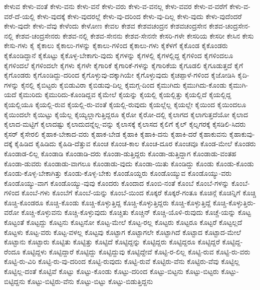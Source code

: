 {ಕೇಳುವ
ಕೇಳು-ವಂತೆ
ಕೇಳು-ವನು
ಕೇಳು-ವನೆ
ಕೇಳು-ವರು
ಕೇಳು-ವ-ವನಲ್ಲ
ಕೇಳು-ವವರ
ಕೇಳು-ವ-ವರೆಗೆ
ಕೇಳು-ವ-ವರೆ-ದೆ-ಯಲ್ಲಿ
ಕೇಳು-ವುದಕ್ಕೆ
ಕೇಳು-ವುದರಲ್ಲೆ
ಕೇಳು-ವು-ದರಿಂದ
ಕೇಳು-ವು-ದಿಲ್ಲ
ಕೇಳು-ವುದು
ಕೇಳು-ವುದೆಂದರೆ
ಕೇಳು-ವುದೇ
ಕೇಳು-ವೆವು
ಕೇಳೆಂದು
ಕೇಳೋಣ
ಕೇವಲ
ಕೇಶವ
ಕೇಶವಚಂದ್ರನ
ಕೇಶವಚಂದ್ರಸೇನ
ಕೇಶವ-ಚಂದ್ರಸೇನ-ನಲ್ಲಿ
ಕೇಶವ-ಚಂದ್ರಸೇನರು
ಕೇಶವ-ನಲ್ಲಿ
ಕೇಶವ-ಸೇನನು
ಕೇಶವ-ಸೇನನೇ
ಕೇಸರಿ-ಗಳೇ
ಕೇಸರಿಯ
ಕೇಸರೀ
ಕೇಸಿನ
ಕೇಸು
ಕೇಸು-ಗಳು
ಕೈ
ಕೈಕಾಲು
ಕೈಕಾಲು-ಗಳನ್ನು
ಕೈಕಾಲು-ಗಳಿಂದ
ಕೈಕಾಲು-ಗಳು
ಕೈಕೆಳಗೆ
ಕೈಕೊಂಡ
ಕೈಕೊಂಡರು
ಕೈಕೊಂಡಿದ್ದಾನೆ
ಕೈಕೊಟ್ಟು
ಕೈಕೊಳ್ಳ-ಬೇಕಾಗು-ವುದು
ಕೈಗಳನ್ನು
ಕೈಗಳಲ್ಲಿ
ಕೈಗಳಲ್ಲಿದ್ದ
ಕೈಗಳಿಂದ
ಕೈಗಳಿಂದಲೂ
ಕೈಗಳಿಂದಲೆ
ಕೈಗಳಿಂದಲೇ
ಕೈಗಳು
ಕೈಗಳೇ
ಕೈಗಾರಿಕೆ
ಕೈಗಾರಿಕೆ-ಗಳನ್ನು
ಕೈಗಾರಿಕೆಯ
ಕೈಗೂಡಲಿ
ಕೈಗೂಡುತ್ತದೆ
ಕೈಗೆ
ಕೈಗೊಂಡರು
ಕೈಗೊಂಡಿದ್ದು-ದರಿಂದ
ಕೈಗೊಳ್ಳುವು-ದಕ್ಕಾಗಿಯೇ
ಕೈಗೊಳ್ಳುವುದು
ಕೈಚಪ್ಪಾಳೆ-ಗಳಿಂದ
ಕೈಜೋಡಿಸಿ
ಕೈದಿ-ಗಳನ್ನು
ಕೈನಲ್ಲಿ
ಕೈಬಿಟ್ಟರು
ಕೈಬಿಡುವಿರಾ
ಕೈಬಿಡುವು-ದಿಲ್ಲ
ಕೈಮಗ್ಗ-ದಿಂದ
ಕೈಮುಗಿದು
ಕೈಮುಗಿದು-ಕೊಂಡು
ಕೈಮುಗಿ-ಯದೆ
ಕೈಮುರಿದು
ಕೈಮುರಿದು-ಕೊಂಡಿದ್ದವ
ಕೈಮೇಲೆ
ಕೈಯನ್ನು
ಕೈಯಲ್ಲಿ
ಕೈಯಲ್ಲಿತ್ತು
ಕೈಯಲ್ಲಿದೆ
ಕೈಯಲ್ಲಿದ್ದ
ಕೈಯಲ್ಲಿಯೂ
ಕೈಯಲ್ಲಿ-ರುವ
ಕೈಯಲ್ಲಿ-ರು-ವಂತೆ
ಕೈಯಲ್ಲಿ-ರುವುದು
ಕೈಯಲ್ಲೆಲ್ಲ
ಕೈಯಲ್ಲೇ
ಕೈಯಿಂದ
ಕೈಯಿಂದಲೂ
ಕೈಯಿಂದಲೇ
ಕೈಯಿಟ್ಟು
ಕೈಯೆಲ್ಲ
ಕೈಯ್ಯಲ್ಲಾಗುತ್ತಿದ್ದರೂ
ಕೈರೋ
ಕೈರೋ-ದಲ್ಲಿ
ಕೈಲಾಗದ
ಕೈಲಾಗುತ್ತದೆಯೋ
ಕೈಲಾದ
ಕೈಲಾದ-ಮಟ್ಟಿಗೆ
ಕೈಲಾದಷ್ಟು
ಕೈಲಾದುದನ್ನೆಲ್ಲ-ವನ್ನು
ಕೈಲಾಸಕ್ಕೆ
ಕೈಲಾಸದ
ಕೈಲಿಗೆ
ಕೈಲ್
ಕೈಲ್ನಗರಕ್ಕೆ
ಕೈಸಡಿಲಿ-ಸಿದರು
ಕೈಸರ್
ಕೈಸೇರಲಿ
ಕೈಹಾಕ-ಬೇಕಾದ-ವರು
ಕೈಹಾಕ-ಬೇಡ
ಕೈಹಾಕಿ
ಕೈಹಾಕಿ-ದನು
ಕೈಹಾಕಿ-ದರೆ
ಕೈಹಾಕುವನು
ಕೈಹಾಕುವು-ದಕ್ಕೆ
ಕೈಹಿಡಿದ
ಕೈಹಿಡಿದು
ಕೈಹಿಡಿ-ದೆತ್ತುವ
ಕೊಂಚ
ಕೊಂಚ-ಕಾಲ
ಕೊಂಚ-ದೂರ
ಕೊಂಚವೂ
ಕೊಂಡ-ಮೇಲೆ
ಕೊಂಡರು
ಕೊಂಡಾಡ-ಲಿಲ್ಲ
ಕೊಂಡಾಡಿ
ಕೊಂಡಾಡಿ-ದರು
ಕೊಂಡಾ-ಡುತ್ತಿದ್ದರು
ಕೊಂಡಾ-ಡುತ್ತಿದ್ದಾಗ
ಕೊಂಡಾಡು-ವಂತಹ
ಕೊಂಡಾ-ಡುವರು
ಕೊಂಡಾಡು-ವಾಗಲೂ
ಕೊಂಡಾಡು-ವುದು
ಕೊಂಡಾ-ಯಿತು
ಕೊಂಡಿದ್ದು
ಕೊಂಡು
ಕೊಂಡು-ಕೊಂಡು
ಕೊಂಡು-ಕೊಳ್ಳ-ಬೇಕಾಗಿತ್ತು
ಕೊಂಡು-ಕೊಳ್ಳ-ಬೇಕು
ಕೊಂಡೊಯ್ದರು
ಕೊಂಡೊಯ್ಯುವ
ಕೊಂಡೊಯ್ಯು-ವರು
ಕೊಂಡೊಯ್ಯು-ವಾಗ
ಕೊಂಡೊಯ್ಯು-ವುವು
ಕೊಂದರು
ಕೊಂದಾದ
ಕೊಂಬಿ-ನಂತೆ
ಕೊಂಬೆ
ಕೊಂಬೆ-ಗಳನ್ನು
ಕೊಂಬೆ-ಗಳಿಂದ
ಕೊಂಬೆ-ಗಳು
ಕೊಂಬೆಗೆ
ಕೊಂಬೆ-ಯನ್ನು
ಕೊಂಬೆ-ಯಿಂದ
ಕೊಕ್ಕರೆ
ಕೊಕ್ಕರೆ-ಗಂತೂ
ಕೊಚಿನ್ಗೆ
ಕೊಚಿನ್ನಿಗೆ
ಕೊಚ್ಚಿ
ಕೊಚ್ಚಿ-ಕೊಂಡರೂ
ಕೊಚ್ಚಿ-ಕೊಂಡು
ಕೊಚ್ಚಿ-ಕೊಳ್ಳುತ್ತಿದ್ದ
ಕೊಚ್ಚಿ-ಕೊಳ್ಳುತ್ತಿದ್ದರು
ಕೊಚ್ಚಿ-ಕೊಳ್ಳುತ್ತಿದ್ದೆ
ಕೊಚ್ಚಿ-ಕೊಳ್ಳುತ್ತಿರು-ವರೋ
ಕೊಚ್ಚಿ-ಕೊಳ್ಳುವನು
ಕೊಚ್ಚಿ-ಕೊಳ್ಳುವುದು
ಕೊಚ್ಚಿತು
ಕೊಚ್ಚಿನ್
ಕೊಚ್ಚಿ-ಯೊಳಿ-ರುವುದು
ಕೊಚ್ಚೆ-ಯನ್ನು
ಕೊಟ್ಟ
ಕೊಟ್ಟಂತೆ
ಕೊಟ್ಟದ್ದು
ಕೊಟ್ಟನು
ಕೊಟ್ಟನೋ
ಕೊಟ್ಟ-ಮೇಲೆ
ಕೊಟ್ಟ-ರಲ್ಲ
ಕೊಟ್ಟರು
ಕೊಟ್ಟರೂ
ಕೊಟ್ಟರೆ
ಕೊಟ್ಟಲ್ಲದೆ
ಕೊಟ್ಟಳು
ಕೊಟ್ಟ-ವರು
ಕೊಟ್ಟ-ವಳಲ್ಲ
ಕೊಟ್ಟವು
ಕೊಟ್ಟಾಗ
ಕೊಟ್ಟಾಗಲೇ
ಕೊಟ್ಟಾಗಿದೆ
ಕೊಟ್ಟಾದ
ಕೊಟ್ಟಾದ-ಮೇಲೆ
ಕೊಟ್ಟಾನು
ಕೊಟ್ಟಾರು
ಕೊಟ್ಟಿತು
ಕೊಟ್ಟಿತ್ತು
ಕೊಟ್ಟಿದೆ
ಕೊಟ್ಟಿದ್ದನ್ನು
ಕೊಟ್ಟಿದ್ದರು
ಕೊಟ್ಟಿದ್ದರೂ
ಕೊಟ್ಟಿದ್ದರೆ
ಕೊಟ್ಟಿದ್ದ-ರೆಂದೂ
ಕೊಟ್ಟಿದ್ದಳು
ಕೊಟ್ಟಿದ್ದಾರೆ
ಕೊಟ್ಟಿದ್ದು
ಕೊಟ್ಟಿದ್ದುವು
ಕೊಟ್ಟಿದ್ದೇವೆ
ಕೊಟ್ಟಿ-ರ-ಲಿಲ್ಲ
ಕೊಟ್ಟಿ-ರುವ
ಕೊಟ್ಟಿ-ರು-ವರು
ಕೊಟ್ಟಿ-ರು-ವಿರಿ
ಕೊಟ್ಟಿ-ರು-ವು-ದರಿಂದ
ಕೊಟ್ಟಿ-ರುವುದು
ಕೊಟ್ಟಿ-ರುವೆ
ಕೊಟ್ಟಿರು-ವೆನು
ಕೊಟ್ಟಿರು-ವೆವು
ಕೊಟ್ಟಿಲ್ಲ
ಕೊಟ್ಟಿಲ್ಲ-ದಂತೆ
ಕೊಟ್ಟಿವೆ
ಕೊಟ್ಟು
ಕೊಟ್ಟು-ಕೊಂಡು
ಕೊಟ್ಟು-ದರಿಂದ
ಕೊಟ್ಟು-ಬಿಟ್ಟನು
ಕೊಟ್ಟು-ಬಿಟ್ಟರು
ಕೊಟ್ಟು-ಬಿಟ್ಟಿದ್ದನು
ಕೊಟ್ಟು-ಬಿಟ್ಟಿರು-ವೆನು
ಕೊಟ್ಟು-ಬಿಟ್ಟು
ಕೊಟ್ಟು-ಬಿಡುತ್ತಿದ್ದನು
}
